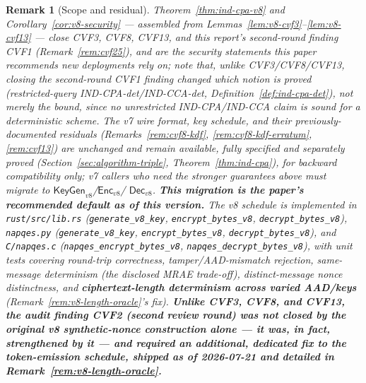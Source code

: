 \documentclass[11pt,a4paper]{article}
\newtheorem{remark}[theorem]{Remark}
\begin{document}
\begin{remark}[Scope and residual]
\label{rem:v8-scope}
Theorem~\ref{thm:ind-cpa-v8} and Corollary~\ref{cor:v8-security} ---
assembled from Lemmas~\ref{lem:v8-cvf3}--\ref{lem:v8-cvf13} --- close CVF3,
CVF8, CVF13, and this report's second-round finding CVF1
(Remark~\ref{rem:cvf25}), and are the security statements this paper
recommends new deployments rely on; note that, unlike CVF3/CVF8/CVF13,
closing the second-round CVF1 finding changed \emph{which} notion is
proved (restricted-query IND-CPA-det/IND-CCA-det, Definition~\ref{def:ind-cpa-det}),
not merely the bound, since no unrestricted IND-CPA/IND-CCA claim is
sound for a deterministic scheme. The v7 wire format, key schedule, and their
previously-documented residuals (Remarks~\ref{rem:cvf8-kdf},
\ref{rem:cvf8-kdf-erratum}, \ref{rem:cvf13}) are unchanged and remain
available, fully specified and separately proved
(Section~\ref{sec:algorithm-triple}, Theorem~\ref{thm:ind-cpa}), for
backward compatibility only; v7 callers who need the stronger guarantees
above must migrate to $\mathsf{KeyGen}_{v8}$/$\mathsf{Enc}_{v8}$/
$\mathsf{Dec}_{v8}$. \textbf{This migration is the paper's recommended
default as of this version.} The v8 schedule is implemented in
\texttt{rust/src/lib.rs} (\texttt{generate\_v8\_key},
\texttt{encrypt\_bytes\_v8}, \texttt{decrypt\_bytes\_v8}), \texttt{napqes.py}
(\texttt{generate\_v8\_key}, \texttt{encrypt\_bytes\_v8},
\texttt{decrypt\_bytes\_v8}), and \texttt{C/napqes.c}
(\texttt{napqes\_encrypt\_bytes\_v8}, \texttt{napqes\_decrypt\_bytes\_v8}),
with unit tests covering round-trip correctness, tamper/AAD-mismatch
rejection, same-message determinism (the disclosed MRAE trade-off),
distinct-message nonce distinctness, and \textbf{ciphertext-length
determinism across varied AAD/keys} (Remark~\ref{rem:v8-length-oracle}'s
fix). \textbf{Unlike CVF3, CVF8, and CVF13, the audit finding CVF2 (second
review round) was not closed by the original v8 synthetic-nonce
construction alone --- it was, in fact, strengthened by it --- and
required an additional, dedicated fix to the token-emission schedule,
shipped as of 2026-07-21 and detailed in Remark~\ref{rem:v8-length-oracle}.}
\end{remark}
\end{document}
